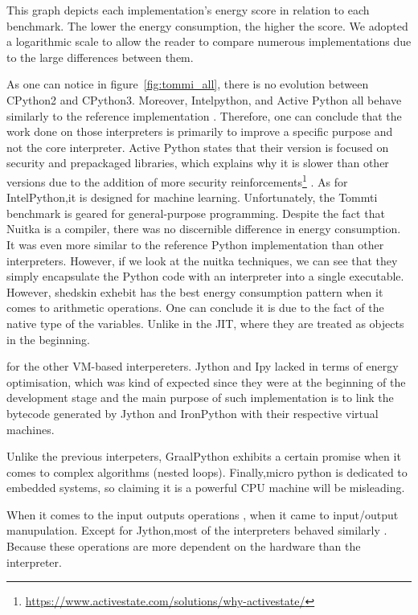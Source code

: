 This graph depicts each implementation's energy score in relation to each benchmark. The lower the energy consumption, the higher the score. We adopted a logarithmic scale to allow the reader to compare numerous implementations due to the large differences between them.


As one can notice in figure~\ref{fig:tommi_all}, there is no evolution between CPython2 and CPython3. Moreover, Intelpython, and Active Python all behave similarly to the reference implementation . Therefore, one can conclude that the work done on those interpreters is primarily to improve a specific purpose and not the core interpreter.
Active Python states that their version is focused on security and prepackaged libraries, which explains why it is slower than other versions due to the addition of more security reinforcements\footnote{\url{https://www.activestate.com/solutions/why-activestate/}} .
As for IntelPython,it is designed for machine learning. Unfortunately, the Tommti benchmark is geared for general-purpose programming.
Despite the fact that Nuitka is a compiler, there was no discernible difference in energy consumption. It was even more similar to the reference Python implementation than other interpreters.
However, if we look at the nuitka techniques, we can see that they simply encapsulate the Python code with an interpreter into a single executable.
However, shedskin exhebit has the best energy consumption pattern when it comes to arithmetic operations. One can conclude it is due to the fact of the native type of the variables. Unlike in the JIT, where they are treated as objects in the beginning.

for the other VM-based interpereters. Jython and Ipy lacked in terms of energy optimisation, which was kind of expected since they were at the beginning of the development stage and the main purpose of such implementation is to link the bytecode generated by Jython and IronPython with their respective virtual machines.

Unlike the previous interpeters, GraalPython exhibits a certain promise when it comes to complex algorithms (nested loops).
Finally,micro python is dedicated to embedded systems, so claiming it is a powerful CPU machine will be misleading.

When it comes to  the input outputs operations , 
when it came to input/output manupulation. Except for Jython,most of the interpreters behaved similarly . Because these operations are more dependent on the hardware than the interpreter.


